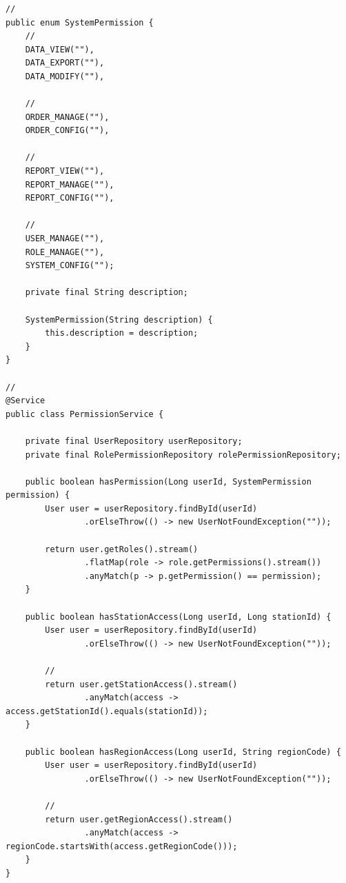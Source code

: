 \hypertarget{section-78}{%
\subsubsection{}\label{section-78}}

\begin{lstlisting}[style=java]
// 
public enum SystemPermission {
    // 
    DATA_VIEW(""),
    DATA_EXPORT(""),
    DATA_MODIFY(""),
    
    // 
    ORDER_MANAGE(""),
    ORDER_CONFIG(""),
    
    // 
    REPORT_VIEW(""),
    REPORT_MANAGE(""),
    REPORT_CONFIG(""),
    
    // 
    USER_MANAGE(""),
    ROLE_MANAGE(""),
    SYSTEM_CONFIG("");
    
    private final String description;
    
    SystemPermission(String description) {
        this.description = description;
    }
}

// 
@Service
public class PermissionService {
    
    private final UserRepository userRepository;
    private final RolePermissionRepository rolePermissionRepository;
    
    public boolean hasPermission(Long userId, SystemPermission permission) {
        User user = userRepository.findById(userId)
                .orElseThrow(() -> new UserNotFoundException(""));
                
        return user.getRoles().stream()
                .flatMap(role -> role.getPermissions().stream())
                .anyMatch(p -> p.getPermission() == permission);
    }
    
    public boolean hasStationAccess(Long userId, Long stationId) {
        User user = userRepository.findById(userId)
                .orElseThrow(() -> new UserNotFoundException(""));
                
        // 
        return user.getStationAccess().stream()
                .anyMatch(access -> access.getStationId().equals(stationId));
    }
    
    public boolean hasRegionAccess(Long userId, String regionCode) {
        User user = userRepository.findById(userId)
                .orElseThrow(() -> new UserNotFoundException(""));
                
        // 
        return user.getRegionAccess().stream()
                .anyMatch(access -> regionCode.startsWith(access.getRegionCode()));
    }
}


\end{lstlisting}
